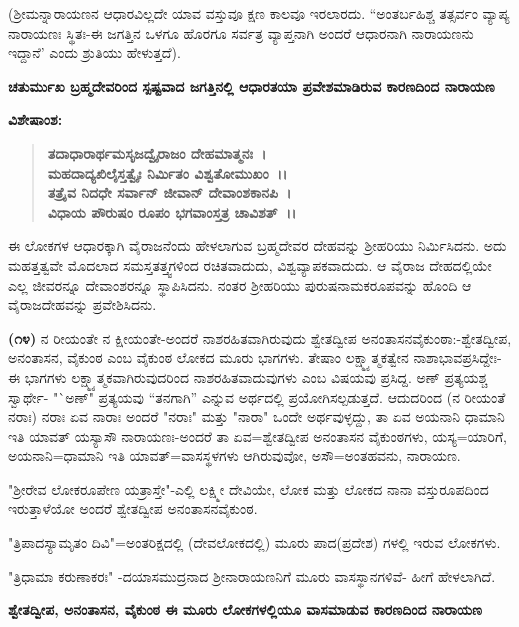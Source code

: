(ಶ‍್ರೀಮನ್ನಾರಾಯಣನ ಆಧಾರವಿಲ್ಲದೇ ಯಾವ ವಸ್ತುವೂ ಕ್ಷಣ ಕಾಲವೂ ಇರಲಾರದು. “ಅಂತರ್ಬಹಿಶ್ಚ ತತ್ಸರ್ವಂ ವ್ಯಾಪ್ಯ ನಾರಾಯಣಃ ಸ್ಥಿತಃ-ಈ ಜಗತ್ತಿನ ಒಳಗೂ ಹೊರಗೂ ಸರ್ವತ್ರ ವ್ಯಾಪ್ತನಾಗಿ ಅಂದರೆ ಆಧಾರನಾಗಿ ನಾರಾಯಣನು ಇದ್ದಾನೆ' ಎಂದು ಶ್ರುತಿಯು ಹೇಳುತ್ತದೆ).

\begin{center}
\textbf{ಚತುರ್ಮುಖ ಬ್ರಹ್ಮದೇವರಿಂದ ಸ್ಪಷ್ಟವಾದ ಜಗತ್ತಿನಲ್ಲಿ ಆಧಾರತಯಾ ಪ್ರವೇಶಮಾಡಿರುವ ಕಾರಣದಿಂದ ನಾರಾಯಣ}
\end{center}

\noindent
\textbf{ವಿಶೇಷಾಂಶ:\enginline{-}}

\begin{verse}
\textbf{ತದಾಧಾರಾರ್ಥಮಸೃಜದ್ವೈರಾಜಂ ದೇಹಮಾತ್ಮನಃ~।}\\\textbf{ಮಹದಾದ್ಯಖಿಲೈಸ್ತತ್ವೈಃ ನಿರ್ಮಿತಂ ವಿಶ್ವತೋಮುಖಂ~।।}\\\textbf{ತತ್ರೈವ ನಿದಧೇ ಸರ್ವಾನ್ ಜೀವಾನ್ ದೇವಾಂಶಕಾನಪಿ~।}\\\textbf{ವಿಧಾಯ ಪೌರುಷಂ ರೂಪಂ ಭಗವಾಂಸ್ತತ್ರ ಚಾವಿಶತ್~।।}
\end{verse}


\noindent
ಈ ಲೋಕಗಳ ಆಧಾರಕ್ಕಾಗಿ ವೈರಾಜನೆಂದು ಹೇಳಲಾಗುವ ಬ್ರಹ್ಮದೇವರ ದೇಹವನ್ನು ಶ‍್ರೀಹರಿಯು ನಿರ್ಮಿಸಿದನು. ಅದು ಮಹತ್ತತ್ವವೇ ಮೊದಲಾದ ಸಮಸ್ತತತ್ತ್ವಗಳಿಂದ ರಚಿತವಾದುದು, ವಿಶ್ವವ್ಯಾಪಕವಾದುದು. ಆ ವೈರಾಜ ದೇಹದಲ್ಲಿಯೇ ಎಲ್ಲ ಜೀವರನ್ನೂ ದೇವಾಂಶರನ್ನೂ ಸ್ಥಾಪಿಸಿದನು. ನಂತರ ಶ‍್ರೀಹರಿಯು ಪುರುಷನಾಮಕರೂಪವನ್ನು ಹೊಂದಿ ಆ ವೈರಾಜದೇಹವನ್ನು ಪ್ರವೇಶಿಸಿದನು.

\textbf{(೧೪)} ನ ರೀಯಂತೇ ನ ಕ್ಷೀಯಂತೇ-ಅಂದರೆ ನಾಶರಹಿತವಾಗಿರುವುದು ಶ್ವೇತದ್ವೀಪ ಅನಂತಾಸನವೈಕುಂಠಾ:-ಶ್ವೇತದ್ವೀಪ, ಅನಂತಾಸನ, ವೈಕುಂಠ ಎಂಬ ವೈಕುಂಠ ಲೋಕದ ಮೂರು ಭಾಗಗಳು. ತೇಷಾಂ ಲಕ್ಷ್ಮ್ಯಾತ್ಮಕತ್ವೇನ ನಾಶಾಭಾವಪ್ರಸಿದ್ದೇಃ- ಈ ಭಾಗಗಳು ಲಕ್ಷ್ಮ್ಯಾತ್ಮಕವಾಗಿರುವುದರಿಂದ ನಾಶರಹಿತವಾದುವುಗಳು ಎಂಬ ವಿಷಯವು ಪ್ರಸಿದ್ದ. ಅಣ್ ಪ್ರತ್ಯಯಶ್ಚ ಸ್ವಾರ್ಥೇ- "`ಅಣ್" ಪ್ರತ್ಯಯವು “ತನಗಾಗಿ'' ಎನ್ನುವ ಅರ್ಥದಲ್ಲಿ ಪ್ರಯೋಗಿಸಲ್ಪ\-ಡುತ್ತದೆ. ಆದುದರಿಂದ (ನ ರೀಯಂತೆ ನರಾಃ) ನರಾಃ ಏವ ನಾರಾಃ ಅಂದರೆ "ನರಾಃ" ಮತ್ತು "ನಾರಾ" ಒಂದೇ ಅರ್ಥವುಳ್ಳದ್ದು, ತಾ ಏವ ಅಯನಾನಿ ಧಾಮಾನಿ ಇತಿ ಯಾವತ್‌ ಯಸ್ಯಾಸೌ ನಾರಾಯಣಃ-ಅಂದರೆ ತಾ ಏವ=ಶ್ವೇತದ್ವೀಪ ಅನಂತಾಸನ ವೈಕುಂಠಗಳು, ಯಸ್ಯ=ಯಾರಿಗೆ, ಅಯನಾನಿ=ಧಾಮಾನಿ ಇತಿ ಯಾವತ್=ವಾಸಸ್ಥಳಗಳು ಆಗಿರುವುವೋ, ಅಸೌ=ಅಂತಹವನು, ನಾರಾಯಣ.

"ಶ‍್ರೀರೇವ ಲೋಕರೂಪೇಣ ಯತ್ರಾಸ್ತೇ"-ಎಲ್ಲಿ ಲಕ್ಷ್ಮೀ ದೇವಿಯೇ, ಲೋಕ ಮತ್ತು ಲೋಕದ ನಾನಾ ವಸ್ತುರೂಪದಿಂದ ಇರುತ್ತಾಳೆಯೋ ಅಂದರೆ ಶ್ವೇತದ್ವೀಪ ಅನಂತಾಸನವೈಕುಂಠ.

"ತ್ರಿಪಾದಸ್ಯಾಮೃತಂ ದಿವಿ"=ಅಂತರಿಕ್ಷದಲ್ಲಿ (ದೇವಲೋಕದಲ್ಲಿ) ಮೂರು ಪಾದ\break (ಪ್ರದೇಶ) ಗಳಲ್ಲಿ ಇರುವ ಲೋಕಗಳು.

"ತ್ರಿಧಾಮಾ ಕರುಣಾಕರಃ" -ದಯಾಸಮುದ್ರನಾದ ಶ‍್ರೀನಾರಾಯಣನಿಗೆ ಮೂರು ವಾಸಸ್ಥಾನಗಳಿವೆ- ಹೀಗೆ ಹೇಳಲಾಗಿದೆ.

\begin{center}
\textbf{ಶ್ವೇತದ್ವೀಪ, ಅನಂತಾಸನ, ವೈಕುಂಠ ಈ ಮೂರು ಲೋಕಗಳಲ್ಲಿಯೂ ವಾಸಮಾಡುವ ಕಾರಣದಿಂದ ನಾರಾಯಣ}
\end{center}

